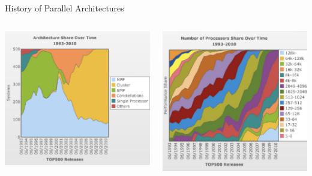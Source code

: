 \begin{frame}{History of Parallel Architectures}
\begin{columns}
\begin{column}{0.5\textwidth}
\begin{center}
\includegraphics[width=\textwidth]{figures/top500_architecture.jpg}
\end{center}
\end{column}
\begin{column}{0.5\textwidth}
\begin{center}
\includegraphics[width=\textwidth]{figures/top500_core_count.jpg}
\end{center}
\end{column}
\end{columns}
\end{frame}

